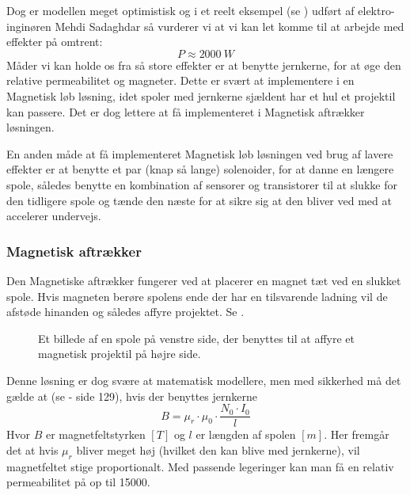 Dog er modellen meget optimistisk og i et reelt eksempel (se \cite{HighEffectExample}) udført af elektro-inginøren Mehdi Sadaghdar så vurderer vi at vi kan let komme til at arbejde med effekter på omtrent:
\[
	P \approx \SI{2000}{W}
\]
Måder vi kan holde os fra så store effekter er at benytte jernkerne, for at øge den relative permeabilitet og magneter. Dette er svært at implementere i en Magnetisk løb løsning, idet spoler med jernkerne sjældent har et hul et projektil kan passere. Det er dog lettere at få implementeret i Magnetisk aftrækker løsningen.

En anden måde at få implementeret Magnetisk løb løsningen ved brug af lavere effekter er at benytte et par (knap så lange) solenoider, for at danne en længere spole, således benytte en kombination af sensorer og transistorer til at slukke for den tidligere spole og tænde den næste for at sikre sig at den bliver ved med at accelerer undervejs.

\subsubsection{Magnetisk aftrækker}
Den Magnetiske aftrækker fungerer ved at placerer en magnet tæt ved en slukket spole. Hvis magneten berøre spolens ende der har en tilsvarende ladning vil de afstøde hinanden og således affyre projektet. Se .
\begin{figure}[H]
	\centering
	\caption{Et billede af en spole på venstre side, der benyttes til at affyre et magnetisk projektil på højre side.}
	\label{fig:MagShooter}
\end{figure}

Denne løsning er dog svære at matematisk modellere, men med sikkerhed må det gælde at (se \cite{Orbit2009} - side 129), hvis der benyttes jernkerne
\[
	B = \mu_r \cdot \mu_0 \cdot \frac{N_0 \cdot I_0}{l}
\] 
Hvor $B$ er magnetfeltstyrken $[\si{T}]$ og $l$ er længden af spolen $[\si{m}]$. Her fremgår det at hvis $\mu_r$ bliver meget høj (hvilket den kan blive med jernkerne), vil magnetfeltet stige proportionalt. Med passende legeringer kan man få en relativ permeabilitet på op til \num{15000}.


